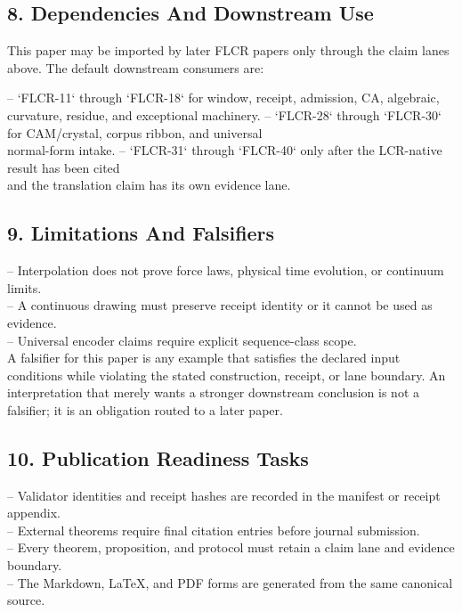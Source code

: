 \documentclass[11pt]{article}
\begin{document}
\subsection*{8. Dependencies And Downstream Use}

This paper may be imported by later FLCR papers only through the claim lanes
above. The default downstream consumers are:

\noindent{}-- `FLCR-11` through `FLCR-18` for window, receipt, admission, CA, algebraic,\\
  curvature, residue, and exceptional machinery.
\noindent{}-- `FLCR-28` through `FLCR-30` for CAM/crystal, corpus ribbon, and universal\\
  normal-form intake.
\noindent{}-- `FLCR-31` through `FLCR-40` only after the LCR-native result has been cited\\
  and the translation claim has its own evidence lane.

\subsection*{9. Limitations And Falsifiers}

\noindent{}-- Interpolation does not prove force laws, physical time evolution, or continuum limits.\\
\noindent{}-- A continuous drawing must preserve receipt identity or it cannot be used as evidence.\\
\noindent{}-- Universal encoder claims require explicit sequence-class scope.\\

A falsifier for this paper is any example that satisfies the declared input
conditions while violating the stated construction, receipt, or lane boundary.
An interpretation that merely wants a stronger downstream conclusion is not a
falsifier; it is an obligation routed to a later paper.

\subsection*{10. Publication Readiness Tasks}

\noindent{}-- Validator identities and receipt hashes are recorded in the manifest or receipt appendix.\\
\noindent{}-- External theorems require final citation entries before journal submission.\\
\noindent{}-- Every theorem, proposition, and protocol must retain a claim lane and evidence boundary.\\
\noindent{}-- The Markdown, LaTeX, and PDF forms are generated from the same canonical source.\\
\end{document}
